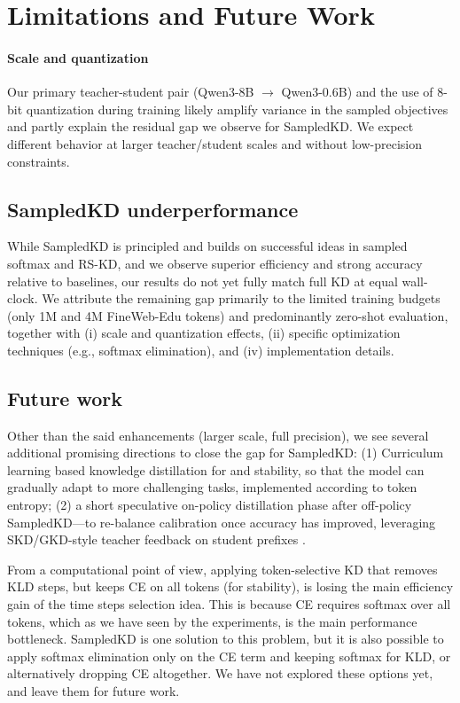 \documentclass[11pt]{article}
\begin{document}
\section{Limitations and Future Work}
\label{sec:limits}
\paragraph{Scale and quantization}
Our primary teacher-student pair (Qwen3-8B $\rightarrow$ Qwen3-0.6B) and the use of 8-bit quantization during training likely amplify variance in the sampled objectives and partly explain the residual gap we observe for SampledKD.
We expect different behavior at larger teacher/student scales and without low-precision constraints.

\subsection{SampledKD underperformance}
While SampledKD is principled and builds on successful ideas in sampled softmax and RS-KD, and we observe superior efficiency and strong accuracy relative to baselines, our results do not yet fully match full KD at equal wall-clock.
We attribute the remaining gap primarily to the limited training budgets (only 1M and 4M FineWeb-Edu tokens) and predominantly zero-shot evaluation, together with (i) scale and quantization effects, (ii) specific optimization techniques  (e.g., softmax elimination), and (iv) implementation details.

\subsection{Future work}
Other than the said enhancements (larger scale, full precision), we see several additional promising directions to close the gap for SampledKD: 
(1) Curriculum learning based knowledge distillation for and stability, so that the model can gradually adapt to more challenging tasks, implemented according to token entropy; (2) a short speculative on-policy distillation phase after off-policy SampledKD---to re-balance calibration once accuracy has improved, leveraging SKD/GKD-style teacher feedback on student prefixes \citep{xu2024speculative}.

From a computational point of view, applying token-selective KD that removes KLD steps, but keeps CE on all tokens (for stability), is losing the main efficiency gain of the time steps selection idea.
This is because CE requires softmax over all tokens, which as we have seen by the experiments, is the main performance bottleneck.
SampledKD is one solution to this problem, but it is also possible to apply softmax elimination only on the CE term and keeping softmax for KLD, or alternatively dropping CE altogether.
We have not explored these options yet, and leave them for future work.
\end{document}
